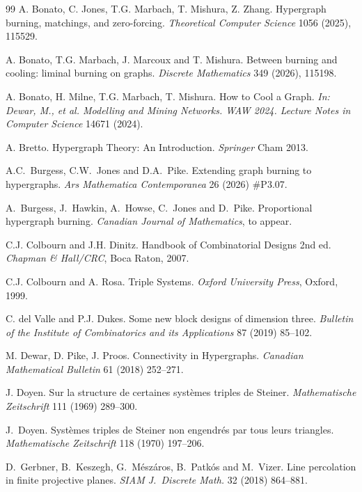 \documentclass[12pt]{article}
\theoremstyle{definition}
\numberwithin{table}{section}
\begin{document}
\begin{thebibliography}{99}
 A. Bonato, C. Jones, T.G. Marbach, T. Mishura, Z. Zhang.
Hypergraph burning, matchings, and zero-forcing. \emph{Theoretical Computer Science} 1056 (2025), 115529.

 A. Bonato, T.G. Marbach, J. Marcoux and T. Mishura.  Between burning and cooling: liminal burning on graphs.  \emph{Discrete Mathematics} 349 (2026), 115198.

A. Bonato, H. Milne, T.G. Marbach,  T. Mishura. How to Cool a Graph. \emph{In: Dewar, M., et al. Modelling and Mining Networks. WAW 2024. Lecture Notes in Computer Science} 14671 (2024).

 A. Bretto. Hypergraph Theory: An Introduction. \emph{Springer} Cham 2013.

 A.C.~Burgess, C.W.~Jones and D.A.~Pike. Extending graph burning to hypergraphs.
\emph{Ars Mathematica Contemporanea} 
26 (2026) \#P3.07.

 A.~Burgess, J.~Hawkin, A.~Howse, C.~Jones and D.~Pike.  Proportional hypergraph burning.  \emph{Canadian Journal of Mathematics}, to appear. 

 C.J. Colbourn and J.H. Dinitz. Handbook of Combinatorial Designs 2nd ed. \emph{Chapman \& Hall/CRC}, Boca Raton, 2007.

 C.J. Colbourn and A. Rosa. Triple Systems. \emph{Oxford University Press}, Oxford, 1999.

 C. del Valle and P.J. Dukes. Some new block designs of dimension three. \emph{Bulletin of the Institute of Combinatorics and its Applications} 87 (2019) 85--102.

 M. Dewar, D. Pike, J. Proos. Connectivity in Hypergraphs. \emph{Canadian Mathematical Bulletin} 61 (2018) 252--271.

 J. Doyen. Sur la structure de certaines syst\`{e}mes triples de Steiner. \emph{Mathematische Zeitschrift} 111 (1969) 289--300.

 J.\ Doyen.  Syst\`{e}mes triples de Steiner non engendr\'{e}s par tous leurs triangles.  \emph{Mathematische Zeitschrift} 118 (1970) 197--206.

 D.\ Gerbner, B.\ Keszegh, G.\ M\'{e}sz\'{a}ros, B.\ Patk\'{o}s and M.\ Vizer.  Line percolation in finite projective planes.  {\em SIAM J.\ Discrete Math.} 32 (2018) 864--881.


\end{thebibliography}
\end{document}
